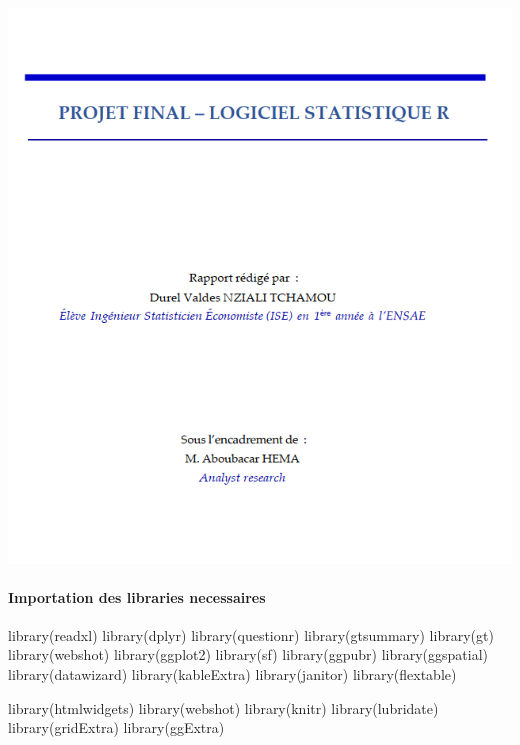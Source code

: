 \documentclass[
  letterpaper,
  DIV=11,
  numbers=noendperiod]{scrartcl}
\let\oldparagraph\paragraph
\renewcommand{\paragraph}[1]{\oldparagraph{#1}\mbox{}}
\newenvironment{Shaded}{\begin{snugshade}}{\end{snugshade}}
\newcommand{\FunctionTok}[1]{\textcolor[rgb]{0.28,0.35,0.67}{#1}}
\newcommand{\NormalTok}[1]{\textcolor[rgb]{0.00,0.23,0.31}{#1}}
\begin{document}
\includegraphics[width=7.61458in,height=\textheight]{assets/image3.png}

\hypertarget{importation-des-libraries-necessaires}{%
\paragraph{Importation des libraries
necessaires}\label{importation-des-libraries-necessaires}}

\begin{Shaded}
\begin{Highlighting}[]
\FunctionTok{library}\NormalTok{(readxl)}
\FunctionTok{library}\NormalTok{(dplyr)}
\FunctionTok{library}\NormalTok{(questionr)}
\FunctionTok{library}\NormalTok{(gtsummary)}
\FunctionTok{library}\NormalTok{(gt)}
\FunctionTok{library}\NormalTok{(webshot)}
\FunctionTok{library}\NormalTok{(ggplot2)}
\FunctionTok{library}\NormalTok{(sf)}
\FunctionTok{library}\NormalTok{(ggpubr)}
\FunctionTok{library}\NormalTok{(ggspatial)}
\FunctionTok{library}\NormalTok{(datawizard)}
\FunctionTok{library}\NormalTok{(kableExtra)}
\FunctionTok{library}\NormalTok{(janitor)}
\FunctionTok{library}\NormalTok{(flextable)}

\FunctionTok{library}\NormalTok{(htmlwidgets)}
\FunctionTok{library}\NormalTok{(webshot)}
\FunctionTok{library}\NormalTok{(knitr)}
\FunctionTok{library}\NormalTok{(lubridate)}
\FunctionTok{library}\NormalTok{(gridExtra)}
\FunctionTok{library}\NormalTok{(ggExtra)}
\end{Highlighting}
\end{Shaded}
\end{document}
